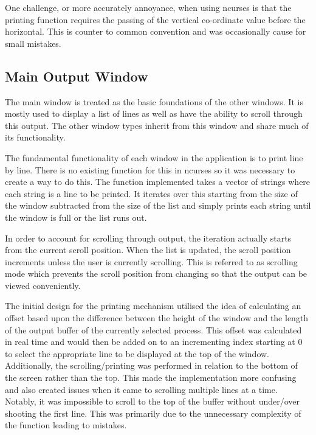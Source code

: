 One challenge, or more accurately annoyance, when using {\selectfont ncurses} is that the printing function requires the passing of the vertical co-ordinate value before the horizontal. This is counter to common convention and was occasionally cause for small mistakes.

\subsection{Main Output Window}

The main window is treated as the basic foundations of the other windows. It is mostly used to display a list of lines as well as have the ability to scroll through this output. The other window types inherit from this window and share much of its functionality.

The fundamental functionality of each window in the application is to print line by line. There is no existing function for this in {\selectfont ncurses} so it was necessary to create a way to do this. The function implemented takes a vector of strings where each string is a line to be printed. It iterates over this starting from the size of the window subtracted from the size of the list and simply prints each string until the window is full or the list runs out.

In order to account for scrolling through output, the iteration actually starts from the current scroll position. When the list is updated, the scroll position increments unless the user is currently scrolling. This is referred to as scrolling mode which prevents the scroll position from changing so that the output can be viewed conveniently.

The initial design for the printing mechanism utilised the idea of calculating an offset based upon the difference between the height of the window and the length of the output buffer of the currently selected process. This offset was calculated in real time and would then be added on to an incrementing index starting at 0 to select the appropriate line to be displayed at the top of the window. Additionally, the scrolling/printing was performed in relation to the bottom of the screen rather than the top. This made the implementation more confusing and also created issues when it came to scrolling multiple lines at a time. Notably, it was impossible to scroll to the top of the buffer without under/over shooting the first line. This was primarily due to the unnecessary complexity of the function leading to mistakes.

